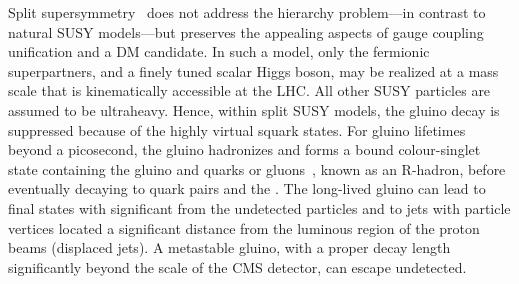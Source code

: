 Split supersymmetry~\cite{ArkaniHamed:2004fb, Giudice:2004tc} does not
address the hierarchy problem---in contrast to natural SUSY
models---but preserves the appealing aspects of gauge coupling
unification and a DM candidate. In such a model, only the fermionic
superpartners, and a finely tuned scalar Higgs boson, may be realized
at a mass scale that is kinematically accessible at the LHC. All other
SUSY particles are assumed to be ultraheavy. Hence, within split SUSY
models, the gluino decay is suppressed because of the highly virtual
squark states. For gluino lifetimes beyond a picosecond, the gluino
hadronizes and forms a bound colour-singlet state containing the
gluino and quarks or gluons~\cite{Fairbairn:2006gg}, known as an
R-hadron, before eventually decaying to quark pairs and the
\PSGczDo. The long-lived gluino can lead to final states with
significant \ptvecmiss from the undetected \PSGczDo particles and to
jets with particle vertices located a significant distance from the
luminous region of the proton beams (displaced jets). A metastable
gluino, with a proper decay length significantly beyond the scale of
the CMS detector, can escape undetected.

